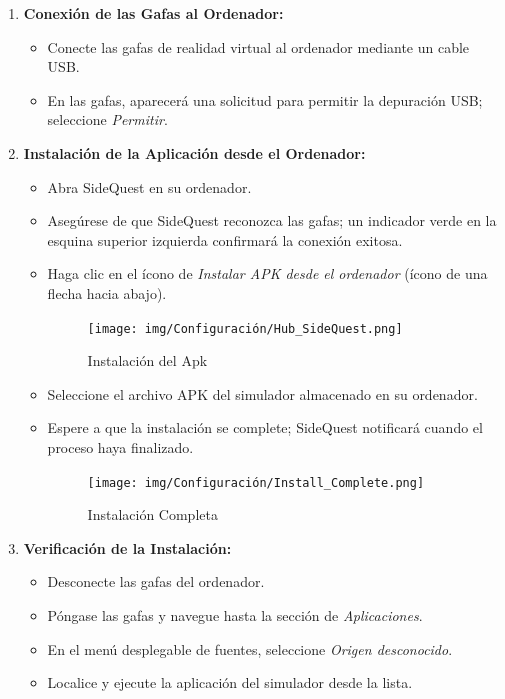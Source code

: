 \begin{enumerate}
    \item \textbf{Conexión de las Gafas al Ordenador:}
    \begin{itemize}
        \item Conecte las gafas de realidad virtual al ordenador mediante un cable USB.
        \item En las gafas, aparecerá una solicitud para permitir la depuración USB; seleccione \textit{Permitir}.
    \end{itemize}
    \item \textbf{Instalación de la Aplicación desde el Ordenador:}
    \begin{itemize}
        \item Abra SideQuest en su ordenador.
        \item Asegúrese de que SideQuest reconozca las gafas; un indicador verde en la esquina superior izquierda confirmará la conexión exitosa.
        \item Haga clic en el ícono de \textit{Instalar APK desde el ordenador} (ícono de una flecha hacia abajo).
        \begin{figure}[thbp]
            \centering
            \texttt{[image: img/Configuración/Hub\_SideQuest.png]}
            \caption{Instalación del Apk}
            \label{fig:Instalación del Apk}
        \end{figure}
        \item Seleccione el archivo APK del simulador almacenado en su ordenador.
        \item Espere a que la instalación se complete; SideQuest notificará cuando el proceso haya finalizado.
        \begin{figure}[thbp]
            \centering
            \texttt{[image: img/Configuración/Install\_Complete.png]}
            \caption{Instalación Completa}
            \label{fig:Instalación Completa}
        \end{figure}
    \end{itemize}
    \item \textbf{Verificación de la Instalación:}
    \begin{itemize}
        \item Desconecte las gafas del ordenador.
        \item Póngase las gafas y navegue hasta la sección de \textit{Aplicaciones}.
        \item En el menú desplegable de fuentes, seleccione \textit{Origen desconocido}.
        \item Localice y ejecute la aplicación del simulador desde la lista.

\end{itemize}
\end{enumerate}
